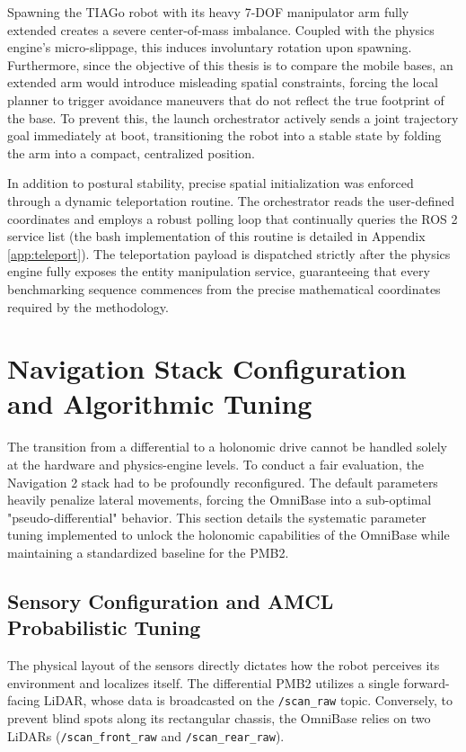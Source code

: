 Spawning the TIAGo robot with its heavy 7-DOF manipulator arm fully extended creates a severe center-of-mass imbalance. Coupled with the physics engine's micro-slippage, this induces involuntary rotation upon spawning. Furthermore, since the objective of this thesis is to compare the mobile bases, an extended arm would introduce misleading spatial constraints, forcing the local planner to trigger avoidance maneuvers that do not reflect the true footprint of the base. To prevent this, the launch orchestrator actively sends a joint trajectory goal immediately at boot, transitioning the robot into a stable state by folding the arm into a compact, centralized position.

In addition to postural stability, precise spatial initialization was enforced through a dynamic teleportation routine. The orchestrator reads the user-defined coordinates and employs a robust polling loop that continually queries the ROS 2 service list (the bash implementation of this routine is detailed in Appendix \ref{app:teleport}). The teleportation payload is dispatched strictly after the physics engine fully exposes the entity manipulation service, guaranteeing that every benchmarking sequence commences from the precise mathematical coordinates required by the methodology.

\section{Navigation Stack Configuration and Algorithmic Tuning}
\label{sec:nav2_tuning}

The transition from a differential to a holonomic drive cannot be handled solely at the hardware and physics-engine levels. To conduct a fair evaluation, the Navigation 2 stack had to be profoundly reconfigured. The default parameters heavily penalize lateral movements, forcing the OmniBase into a sub-optimal "pseudo-differential" behavior. This section details the systematic parameter tuning implemented to unlock the holonomic capabilities of the OmniBase while maintaining a standardized baseline for the PMB2.

\subsection{Sensory Configuration and AMCL Probabilistic Tuning}
\label{subsec:amcl_tuning}

The physical layout of the sensors directly dictates how the robot perceives its environment and localizes itself. The differential PMB2 utilizes a single forward-facing LiDAR, whose data is broadcasted on the \texttt{/scan\_raw} topic. Conversely, to prevent blind spots along its rectangular chassis, the OmniBase relies on two LiDARs (\texttt{/scan\_front\_raw} and \texttt{/scan\_rear\_raw}). 

